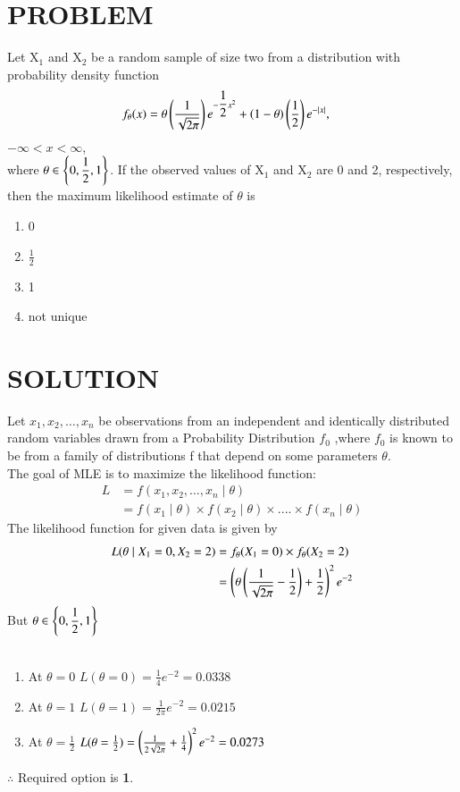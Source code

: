 \documentclass[journal,12pt,twocolumn]{IEEEtran}
\begin{document}
\section{PROBLEM}
Let X$_{1}$ and X$_{2}$ be a random sample of size two
from a distribution with probability density
function
\begin{align}
    f_{\theta}(x) &= \theta \left(\dfrac{1}{\sqrt{2\pi}}\right)e^{-\dfrac{1}{2} x^{2}} + \left(1-\theta\right)\left(\dfrac{1}{2}\right)e^{-\mid x\mid} \nonumber,
\end{align}
$-\infty<x<\infty$,\\
where  $\theta \in \left\{ 0,\dfrac{1}{2}, 1 \right\}$. If the observed values
of X$_{1}$ and X$_{2}$ are 0 and 2, respectively, then
the maximum likelihood estimate of $\theta$ is
\begin{enumerate}
    \item 0 
    \item $\frac{1}{2}$
    \item 1
    \item not unique
\end{enumerate}
\section{SOLUTION}
Let $x_1, x_2, \ldots, x_n$
be observations from an independent and identically distributed random variables drawn from a Probability Distribution $f_0$
,where $f_0$ is known to be from a family of distributions f that depend on some parameters $\theta$.\\
The goal of MLE is to maximize the likelihood function:
 \begin{align}
L&= f(x_1,x_2, \ldots,x_n \; | \;\theta)\\
 &=f(x_1 \;|\; \theta)\times f(x_2 \; |\; \theta)\times....\times f(x_n \;|\;\theta)
\end{align}
The likelihood function for given data is given by 
\begin{align}
    L(\theta \hspace{0.1cm}|\hspace{0.1cm}X_{1}=0,X_{2}=2)  &=f_{\theta}(X_{1}=0)\times f_{\theta}(X_{2}=2)\\
    &=\left(\theta\left(\dfrac{1}{\sqrt{2\pi}}-\frac{1}{2}\right)+\frac{1}{2}\right)^{2}e^{-2} 
\end{align}
But $\theta \in \left\{ 0,\dfrac{1}{2}, 1 \right\}$\\\\
\begin{enumerate}
    \item At $\theta=0$ \hspace{0.5cm} $L(\theta=0)=\frac{1}{4}e^{-2}=0.0338$\\
    \item At $\theta=1$ \hspace{0.5cm} $L(\theta=1)=\frac{1}{2\pi}e^{-2}=0.0215$\\
    \item At $\theta=\frac{1}{2}$ \hspace{0.2cm}
    $L(\theta=\frac{1}{2})=\left(\frac{1}{2\sqrt{2\pi}}+\frac{1}{4}\right)^{2}e^{-2}=0.0273$
\end{enumerate}
$\therefore$ Required option is \textbf{1}.
\end{document}
